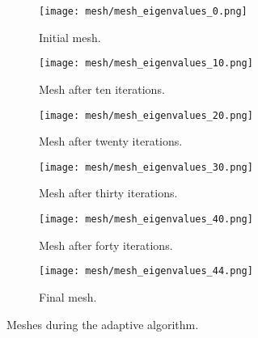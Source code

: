 \begin{figure}[htbp]
    \begin{subfigure}[t]{0.49\textwidth}
        \centering
        \texttt{[image: mesh/mesh\_eigenvalues\_0.png]}
        \caption{Initial mesh.}
        \label{fig:mesh_0}
    \end{subfigure}
    \begin{subfigure}[t]{0.49\textwidth}
        \centering
        \texttt{[image: mesh/mesh\_eigenvalues\_10.png]}
        \caption{Mesh after ten iterations.}
        \label{fig:mesh_10}
    \end{subfigure}
    \vspace{1cm}
    \begin{subfigure}[t]{0.49\textwidth}
        \centering
        \texttt{[image: mesh/mesh\_eigenvalues\_20.png]}
        \caption{Mesh after twenty iterations.}
        \label{fig:mesh_20}
    \end{subfigure}
    \begin{subfigure}[t]{0.49\textwidth}
        \centering
        \texttt{[image: mesh/mesh\_eigenvalues\_30.png]}
        \caption{Mesh after thirty iterations.}
        \label{fig:mesh_30}
    \end{subfigure}
    \vspace{1cm}
    \begin{subfigure}[t]{0.49\textwidth}
        \centering
        \texttt{[image: mesh/mesh\_eigenvalues\_40.png]}
        \caption{Mesh after forty iterations.}
        \label{fig:mesh_40}
    \end{subfigure}
    \begin{subfigure}[t]{0.49\textwidth}
        \centering
        \texttt{[image: mesh/mesh\_eigenvalues\_44.png]}
        \caption{Final mesh.}
        \label{fig:mesh_50}
    \end{subfigure}
    \caption{Meshes during the adaptive algorithm.}
\end{figure}


